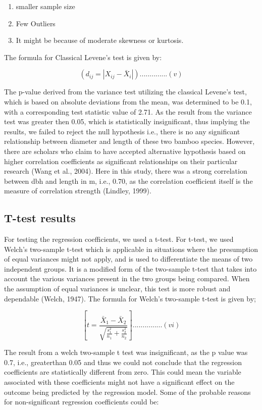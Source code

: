 \documentclass[preprint, 3p,
authoryear]{elsarticle} %
\begin{document}
\begin{enumerate}
\def\labelenumi{\alph{enumi}.}
\item
  smaller sample size
\item
  Few Outliers
\item
  It might be because of moderate skewness or kurtosis.
\end{enumerate}

The formula for Classical Levene's test is given by:

\[( d_{ij} = |X_{ij} - \bar{X}_i| ) ..............(v)\]

The p-value derived from the variance test utilizing the classical
Levene's test, which is based on absolute deviations from the mean, was
determined to be 0.1, with a corresponding test statistic value of 2.71.
As the result from the variance test was greater then 0.05, which is
statistically insignificant, thus implying the results, we failed to
reject the null hypothesis i.e., there is no any significant
relationship between diameter and length of these two bamboo species.
However, there are scholars who claim to have accepted alternative
hypothesis based on higher correlation coefficients as significant
relationships on their particular research (Wang et al., 2004). Here in
this study, there was a strong correlation between dbh and length in m,
i.e., 0.70, as the correlation coefficient itself is the measure of
correlation strength (Lindley, 1999).

\hypertarget{t-test-results}{%
\subsection{T-test results}\label{t-test-results}}

For testing the regression coefficients, we used a t-test. For t-test,
we used Welch's two-sample t-test which is applicable in situations
where the presumption of equal variances might not apply, and is used to
differentiate the means of two independent groups. It is a modified form
of the two-sample t-test that takes into account the various variances
present in the two groups being compared. When the assumption of equal
variances is unclear, this test is more robust and dependable (Welch,
1947). The formula for Welch's two-sample t-test is given by;

\[[ t = \frac{{\bar{X}_1 - \bar{X}_2}}{{\sqrt{\frac{{s_1^2}}{{n_1}} + \frac{{s_2^2}}{{n_2}}}}} ]...............(vi) \]

The result from a welch two-sample t test was insignificant, as the p
value was 0.7, i.e., greaterthan 0.05 and thus we could not conclude
that the regression coefficients are statistically different from zero.
This could mean the variable associated with these coefficients might
not have a significant effect on the outcome being predicted by the
regression model. Some of the probable reasons for non-significant
regression coefficients could be:
\end{document}
